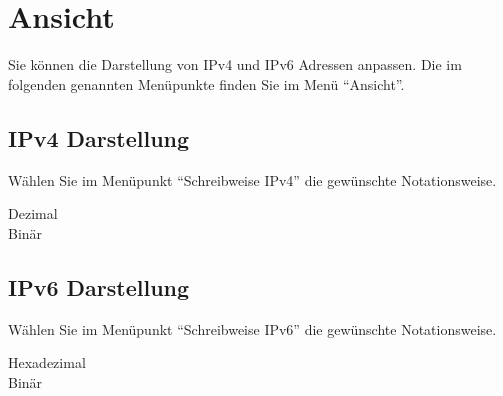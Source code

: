 \section{Ansicht}
Sie können die Darstellung von IPv4 und IPv6 Adressen anpassen.
Die im folgenden genannten Menüpunkte finden Sie im Menü "`Ansicht"'.

\subsection{IPv4 Darstellung}
Wählen Sie im Menüpunkt "`Schreibweise IPv4"' die gewünschte Notationsweise.

\begin{description}
    \item[Dezimal] 
    \item[Binär] 
\end{description}

\subsection{IPv6 Darstellung}
Wählen Sie im Menüpunkt "`Schreibweise IPv6"' die gewünschte Notationsweise.

\begin{description}
    \item[Hexadezimal] 
    \item[Binär] 
\end{description}